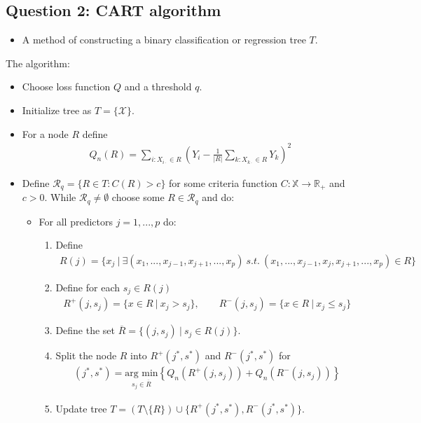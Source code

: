 \documentclass[a4paper,12pt,openany]{book}
\providecommand{\tightlist}{%
 \setlength{\itemsep}{0pt}\setlength{\parskip}{0pt}}
\begin{document}
\hypertarget{question-2-cart-algorithm}{%
\subsection{Question 2: CART algorithm}\label{question-2-cart-algorithm}}

\begin{itemize}
\tightlist
\item
  A method of constructing a binary classification or regression tree \(T\).
\end{itemize}

The algorithm:

\begin{itemize}
\tightlist
\item
  Choose loss function \(Q\) and a threshold \(q\).
\item
  Initialize tree as \(T=\{\mathcal X\}\).
\item
  For a node \(R\) define
  \begin{align*}
    Q_n(R)=\sum_{i : X_{i\cdot} \in R}\left( Y_i - \frac{1}{\vert R\vert}\sum_{k : X_{k\cdot}\in R} Y_k\right)^2
    \end{align*}
\item
  Define \(\mathcal R_q=\{R\in T : C(R)>c\}\) for some criteria function \(C : \mathbb X\to\mathbb R_+\) and \(c>0\). While \(\mathcal R_q\ne \emptyset\) choose some \(R\in \mathcal R_q\) and do:

  \begin{itemize}
  \tightlist
  \item
    For all predictors \(j=1,...,p\) do:

    \begin{enumerate}
    \def\labelenumi{(\alph{enumi})}
    \tightlist
    \item
      Define
      \begin{align*}
      R(j)=\{x_j\ \vert\ \exists (x_1,...,x_{j-1},x_{j+1},...,x_p)\ s.t.\ (x_1,...,x_{j-1},x_j,x_{j+1},...,x_p)\in R \}
      \end{align*}
    \item
      Define for each \(s_j\in R(j)\)
      \begin{align*}
      R^+(j,s_j)=\{x\in R\ \vert\ x_j> s_j\},\qquad R^-(j,s_j)=\{x\in R\ \vert\ x_j\le s_j\}
      \end{align*}
    \item
      Define the set \(\overline R=\{(j,s_j)\ \vert\ s_j\in R(j)\}\).
    \item
      Split the node \(R\) into \(R^+(j^*,s^*)\) and \(R^-(j^*,s^*)\) for
      \begin{align*}
      (j^*,s^*)=\underset{s_j\in \overline R}{\text{arg min}}\left\{ Q_n(R^+(j,s_j))+Q_n(R^-(j,s_j))\right\}
      \end{align*}
    \item
      Update tree \(T=(T\setminus \{R\})\cup \{R^+(j^*,s^*),R^-(j^*,s^*)\}\).
    \end{enumerate}
  \end{itemize}
\end{itemize}
\end{document}
